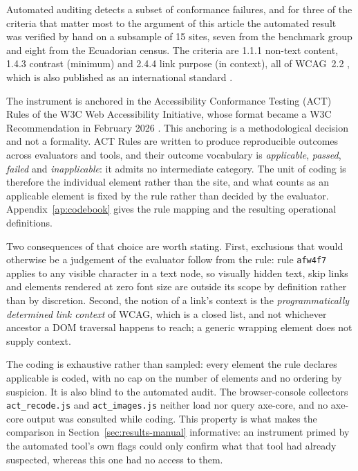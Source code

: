 \documentclass[]{interact}
\begin{document}
Automated auditing detects a subset of conformance failures, and for three of the criteria that matter most to the argument of this article the automated result was verified by hand on a subsample of 15 sites, seven from the benchmark group and eight from the Ecuadorian census. The criteria are 1.1.1 non-text content, 1.4.3 contrast (minimum) and 2.4.4 link purpose (in context), all of WCAG~2.2 \citep{wcag22}, which is also published as an international standard \citep{iso40500}.

The instrument is anchored in the Accessibility Conformance Testing (ACT) Rules of the W3C Web Accessibility Initiative, whose format became a W3C Recommendation in February 2026 \citep{actformat}. This anchoring is a methodological decision and not a formality. ACT Rules are written to produce reproducible outcomes across evaluators and tools, and their outcome vocabulary is \emph{applicable}, \emph{passed}, \emph{failed} and \emph{inapplicable}: it admits no intermediate category. The unit of coding is therefore the individual element rather than the site, and what counts as an applicable element is fixed by the rule rather than decided by the evaluator. Appendix~\ref{ap:codebook} gives the rule mapping \citep{actrules} and the resulting operational definitions.

Two consequences of that choice are worth stating. First, exclusions that would otherwise be a judgement of the evaluator follow from the rule: rule \texttt{afw4f7} applies to any visible character in a text node, so visually hidden text, skip links and elements rendered at zero font size are outside its scope by definition rather than by discretion. Second, the notion of a link's context is the \emph{programmatically determined link context} of WCAG, which is a closed list, and not whichever ancestor a DOM traversal happens to reach; a generic wrapping element does not supply context.

The coding is exhaustive rather than sampled: every element the rule declares applicable is coded, with no cap on the number of elements and no ordering by suspicion. It is also blind to the automated audit. The browser-console collectors \texttt{act\_recode.js} and \texttt{act\_images.js} neither load nor query axe-core, and no axe-core output was consulted while coding. This property is what makes the comparison in Section~\ref{sec:results-manual} informative: an instrument primed by the automated tool's own flags could only confirm what that tool had already suspected, whereas this one had no access to them.
\end{document}
